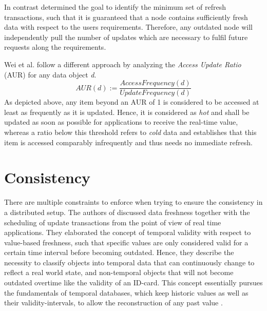 In contrast \cite{peralta:2006} determined the goal to identify the minimum set of refresh transactions, such that it is guaranteed that a node contains 
sufficiently fresh data with respect to the users requirements. Therefore, any outdated node will independently pull the number of updates which are necessary to 
fulfil future requests along the requirements.

Wei et al. \cite{wei:2004} follow a different approach by analyzing the \emph{Access Update Ratio} (AUR) for any data object \textit{d}. 
\begin{equation}
AUR(d) := \frac{AccessFrequency(d)}{UpdateFrequency(d)}
\end{equation}
As depicted above, any item beyond an AUR of 1 is considered to be accessed at least as frequently as it is updated.
Hence, it is considered as \emph{hot} and shall be updated as soon as possible for applications to receive the real-time value, 
whereas a ratio below this threshold refers to \emph{cold} data and establishes that this item is accessed comparably infrequently and thus needs no immediate refresh. 






\section{Consistency}
\label{sec:consistency}
There are multiple constraints to enforce when trying to ensure the consistency in a distributed setup.
The authors of \cite{wei:2004, xiang:2008} discussed data freshness together with the scheduling of update transactions from the 
point of view of real time applications. They elaborated the concept of temporal validity with respect to value-based freshness,
such that specific values are only considered valid for a certain time interval before becoming outdated. Hence, they describe the necessity to classify objects into
temporal data that can continuously change to reflect a real world state, and non-temporal objects that will not become outdated overtime like the validity of an ID-card.
This concept essentially pursues the fundamentals of temporal databases, which keep historic values as well as their validity-intervals, to allow the reconstruction of any 
past value \cite{etzion:1998}. 

